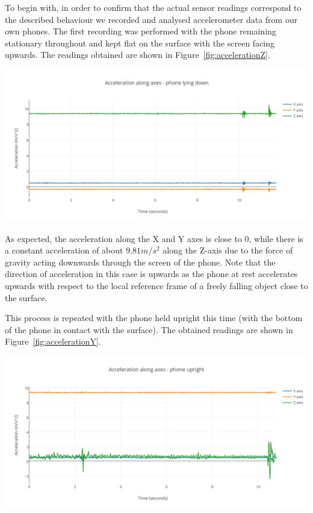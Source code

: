 \documentclass[12pt,a4paper]{report}
\begin{document}
To begin with, in order to confirm that the actual sensor readings correspond to the described behaviour we recorded and analysed accelerometer data from our own phones. The first recording was performed with the phone remaining stationary throughout and kept flat on the surface with the screen facing upwards. The readings obtained are shown in Figure~\ref{fig:accelerationZ}.

\begin{center}
\includegraphics[scale=0.9]{images/accelerationZ.png}
\label{fig:accelerationZ}
\end{center}

As expected, the acceleration along the X and Y axes is close to 0, while there is a constant acceleration of about $9.81 m/s^2$ along the Z-axis due to the force of gravity acting downwards through the screen of the phone. Note that the direction of acceleration in this case is upwards as the phone at rest accelerates upwards with respect to the local reference frame of a freely falling object close to the surface. 

This process is repeated with the phone held upright this time (with the bottom of the phone in contact with the surface). The obtained readings are shown in Figure~\ref{fig:accelerationY}.

\begin{center}
\includegraphics[scale=0.9]{images/accelerationY.png}
\label{fig:accelerationY}
\end{center}
\end{document}
